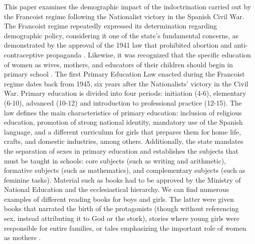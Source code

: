 \documentclass[a4paper,oneside,final,onecolumn,11pt,english]{article}
\begin{document}
 This paper examines the demographic impact of the indoctrination carried out by the Francoist regime following the Nationalist victory in the Spanish Civil War.
  The Francoist regime repeatedly expressed its determination regarding demographic policy, considering it one of the state's fundamental concerns, as demonstrated by the approval of the 1941 law that prohibited abortion and anti-contraceptive propaganda \citep[][p. 768-770]{boe1941}. Likewise, it was recognized that the specific education of women as wives, mothers, and educators of their children should begin in primary school \citep[][]{consigna1941}. The first Primary Education Law enacted during the Francoist regime dates back from 1945, six years after the Nationalists' victory in the  Civil War. Primary education is divided into four periods: initiation (4-6), elementary (6-10), advanced (10-12) and introduction to professional practice (12-15). The law defines the main characteristics of primary education: inclusion of religious education, promotion of strong national identity, mandatory use of the Spanish language, and a different curriculum for girls that prepares them for home life, crafts, and domestic industries, among others.  %
 Additionally, the state mandates the separation of sexes in primary education and establishes the subjects that must be taught in schools: core subjects (such as writing and arithmetic), formative subjects (such as mathematics), and complementary subjects (such as feminine tasks). Material such as books had to be approved by the Ministry of National Education and the ecclesiastical hierarchy. We can find numerous examples of different reading books for boys and girls. The latter were given books that narrated the birth of the protagonists (though without referencing sex, instead attributing it to God or the stork), stories where young girls were responsible for entire families, or tales emphasizing the important role of women as mothers \citep[][]{mahamud2016}.
\end{document}

